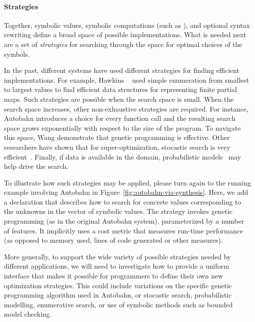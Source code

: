 \paragraph*{Strategies}
Together, symbolic values, symbolic computations (such as ),
and optional syntax rewriting define a broad space of possible
implementations.  What is needed next are a set of \emph{strategies}
for searching through the space for optimal choices of the symbols.

In the past, different systems have used different strategies for finding
efficient implementations.  For example, Hawkins \etal~\cite{data-rep-synth} used
simple enumeration from smallest to largest values to find efficient
data structures for representing finite partial maps.  Such strategies are
possible when the search space is small.  When the search space increases,
other non-exhaustive strategies are required.  For instance, Autobahn 
introduces a choice for every function call and the resulting search
space grows exponentially with respect to the size of the program.  To
navigate this space, Wang \etal{} demonstrate that genetic programming is effective.
Other researchers have shown that for super-optimization, stocastic search is very
efficient~\cite{stochastic-superopt}.  Finally, if data is available in the domain, probabilistic
models~\cite{probabilistic-netkat} may help drive the search.

To illustrate how such strategies may be applied, please turn again to
the running example \rasp involving Autobahn in
Figure~\ref{fig:autobahn-via-synthesis}.  Here, we add a declaration
that describes how to search for concrete values corresponding to the
unknowns in the  vector of symbolic values.  The strategy
invokes genetic programming (as in the original Autobahn system),
parameterized by a number of features.  It implicitly uses a
cost metric that measures run-time performance (as opposed to memory used,
lines of code generated or other measures). 

More generally, to support the wide variety of possible strategies
needed by different applications, we will need to investigate how to
provide a uniform interface that makes it possible for programmers to
define their own new optimization strategies.  This could include
variations on the specific genetic programming algorithm used in
Autobahn, or stocastic search, probabilistic modelling, enumerative
search, or use of symbolic methods such as bounded model checking.

